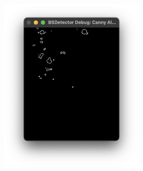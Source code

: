 \begin{figure}[H]
\begin{subfigure}{.6\textwidth}
\begin{subfigure}{0.32\textwidth}
            \includegraphics[width=1\linewidth]{assets/sys_canny.png}
            \caption{}
            \label{fig:sys_canny}
        \end{subfigure}
        \hfill
        \begin{subfigure}{0.32\textwidth}
            \centering

\end{subfigure}
\end{subfigure}
\end{figure}
